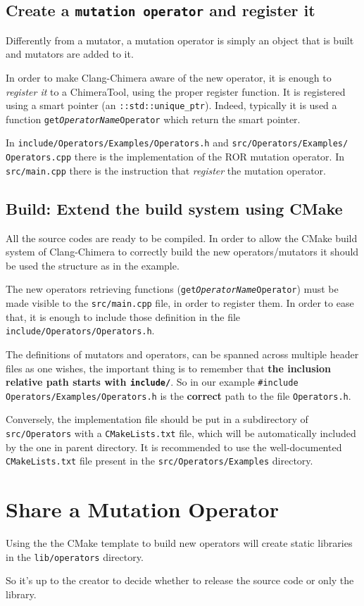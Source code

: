 \documentclass[10pt,a4paper]{article}
\begin{document}
\subsection{Create a \texttt{mutation operator} and register it}
Differently from a mutator, a mutation operator is simply an object that is built and mutators are added to it.

In order to make Clang-Chimera aware of the new operator, it is enough to \textit{register it} to a ChimeraTool, using the proper register function. It is registered using a smart pointer (an \texttt{::std::unique\_ptr}). Indeed, typically it is used a function \texttt{get\textit{OperatorName}Operator} which return the smart pointer.

In \texttt{include/Operators/Examples/Operators.h} and \texttt{src/Operators/Examples/\\Operators.cpp} there is the implementation of the ROR mutation operator. In \texttt{src/main.cpp} there is the instruction that \textit{register} the mutation operator.

\subsection{Build: Extend the build system using CMake}
All the source codes are ready to be compiled. In order to allow the CMake build system of Clang-Chimera to correctly build the new operators/mutators it should be used the structure as in the example.

The new operators retrieving functions (\texttt{get\textit{OperatorName}Operator}) must be made visible to the \texttt{src/main.cpp} file, in order to register them. 
In order to ease that, it is enough to include those definition in the file \texttt{include/Operators/Operators.h}.

The definitions of mutators and operators, can be spanned across multiple header files as one wishes, the important thing is to remember that \textbf{the inclusion relative path starts with \texttt{include/}}. So in our example \texttt{\#include Operators/Examples/Operators.h} is the \textbf{correct} path to the file \texttt{Operators.h}.

Conversely, the implementation file should be put in a subdirectory of \texttt{src/Operators} with a \texttt{CMakeLists.txt} file, which will be automatically included by the one in parent directory.
It is recommended to use the well-documented \texttt{CMakeLists.txt} file present in the \texttt{src/Operators/Examples} directory.

\section{Share a Mutation Operator}
Using the the CMake template to build new operators will create static libraries in the \texttt{lib/operators} directory.

So it's up to the creator to decide whether to release the source code or only the library.
\end{document}

